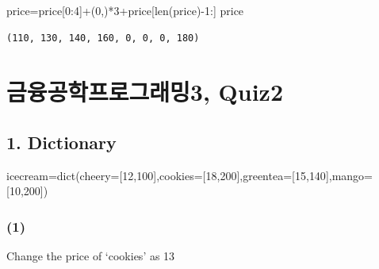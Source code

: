 \documentclass[
  letterpaper,
  DIV=11,
  numbers=noendperiod]{scrreprt}
\newenvironment{Shaded}{\begin{snugshade}}{\end{snugshade}}
\newcommand{\BuiltInTok}[1]{\textcolor[rgb]{0.00,0.23,0.31}{#1}}
\newcommand{\DecValTok}[1]{\textcolor[rgb]{0.68,0.00,0.00}{#1}}
\newcommand{\NormalTok}[1]{\textcolor[rgb]{0.00,0.23,0.31}{#1}}
\newcommand{\OperatorTok}[1]{\textcolor[rgb]{0.37,0.37,0.37}{#1}}
\begin{document}
\begin{Shaded}
\begin{Highlighting}[]
\NormalTok{price}\OperatorTok{=}\NormalTok{price[}\DecValTok{0}\NormalTok{:}\DecValTok{4}\NormalTok{]}\OperatorTok{+}\NormalTok{(}\DecValTok{0}\NormalTok{,)}\OperatorTok{*}\DecValTok{3}\OperatorTok{+}\NormalTok{price[}\BuiltInTok{len}\NormalTok{(price)}\OperatorTok{{-}}\DecValTok{1}\NormalTok{:]}
\NormalTok{price}
\end{Highlighting}
\end{Shaded}

\begin{verbatim}
(110, 130, 140, 160, 0, 0, 0, 180)
\end{verbatim}

\chapter*{금융공학프로그래밍3,
Quiz2}\label{uxae08uxc735uxacf5uxd559uxd504uxb85cuxadf8uxb798uxbc0d3-quiz2}


\section*{1. Dictionary}\label{dictionary}


\begin{Shaded}
\begin{Highlighting}[]
\NormalTok{icecream}\OperatorTok{=}\BuiltInTok{dict}\NormalTok{(cheery}\OperatorTok{=}\NormalTok{[}\DecValTok{12}\NormalTok{,}\DecValTok{100}\NormalTok{],cookies}\OperatorTok{=}\NormalTok{[}\DecValTok{18}\NormalTok{,}\DecValTok{200}\NormalTok{],greentea}\OperatorTok{=}\NormalTok{[}\DecValTok{15}\NormalTok{,}\DecValTok{140}\NormalTok{],mango}\OperatorTok{=}\NormalTok{[}\DecValTok{10}\NormalTok{,}\DecValTok{200}\NormalTok{])}
\end{Highlighting}
\end{Shaded}

\subsection*{(1)}\label{section-7}

Change the price of `cookies' as 13
\end{document}

